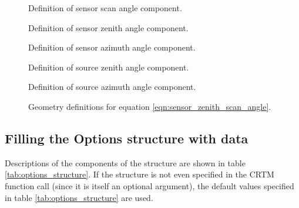 \begin{figure}[htp]
  \centering
  
  \caption{Definition of \Geometry{} sensor scan angle component.}
  \label{fig:geo_sensor_scan_angle}
\end{figure}

\begin{figure}[htp]
  \centering
  
  \caption{Definition of \Geometry{} sensor zenith angle component.}
  \label{fig:geo_sensor_zenith_angle}
\end{figure}

\begin{figure}[htp]
  \centering
  
  \caption{Definition of \Geometry{} sensor azimuth angle component.}
  \label{fig:geo_sensor_azimuth_angle}
\end{figure}

\begin{figure}[htp]
  \centering
  
  \caption{Definition of \Geometry{} source zenith angle component.}
  \label{fig:geo_source_zenith_angle}
\end{figure}

\begin{figure}[htp]
  \centering
  
  \caption{Definition of \Geometry{} source azimuth angle component.}
  \label{fig:geo_source_azimuth_angle}
\end{figure}

\begin{figure}[htp]
  \centering
  
  \caption{Geometry definitions for equation \ref{eqn:sensor_zenith_scan_angle}.}
  \label{fig:geo_sensor_zenith_scan_angle}
\end{figure}




\subsection{Filling the Options structure with data}
\label{sec:fill_step-options}

Descriptions of the components of the \hyperref[sec:options_structure]{\Options} structure are shown in table \ref{tab:options_structure}. If the \hyperref[sec:options_structure]{\Options} structure is not even specified in the CRTM function call (since it is itself an optional argument), the default values specified in table \ref{tab:options_structure} are used.

